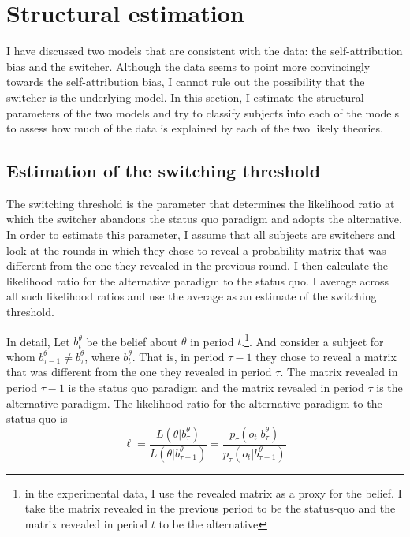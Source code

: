 \documentclass[
  12pt,
]{article}
\begin{document}
\hypertarget{structural-estimation}{%
\section{Structural estimation}\label{structural-estimation}}

I have discussed two models that are consistent with the data: the
self-attribution bias and the switcher. Although the data seems to point
more convincingly towards the self-attribution bias, I cannot rule out
the possibility that the switcher is the underlying model. In this
section, I estimate the structural parameters of the two models and try
to classify subjects into each of the models to assess how much of the
data is explained by each of the two likely theories.

\hypertarget{estimation-of-the-switching-threshold}{%
\subsection{Estimation of the switching
threshold}\label{estimation-of-the-switching-threshold}}

The switching threshold is the parameter that determines the likelihood
ratio at which the switcher abandons the status quo paradigm and adopts
the alternative. In order to estimate this parameter, I assume that all
subjects are switchers and look at the rounds in which they chose to
reveal a probability matrix that was different from the one they
revealed in the previous round. I then calculate the likelihood ratio
for the alternative paradigm to the status quo. I average across all
such likelihood ratios and use the average as an estimate of the
switching threshold.

In detail, Let \(b_{t}^\theta\) be the belief about \(\theta\) in period
\(t\).\footnote{in the experimental data, 
I use the revealed matrix as a proxy for the belief. I take the matrix revealed in the previous period 
to be the status-quo and the matrix revealed in period $t$ to be the alternative}.
And consider a subject for whom
\(b_{\tau-1}^\theta \neq b_{\tau}^\theta\), where \(b_{t}^\theta\). That
is, in period \(\tau-1\) they chose to reveal a matrix that was
different from the one they revealed in period \(\tau\). The matrix
revealed in period \(\tau-1\) is the status quo paradigm and the matrix
revealed in period \(\tau\) is the alternative paradigm. The likelihood
ratio for the alternative paradigm to the status quo is \[
\ell = \frac{L(\theta | b_{\tau}^\theta)}{L(\theta | b_{\tau-1}^\theta)}=\frac{p_\tau(o_t|b_{\tau}^\theta)}{p_{\tau}(o_t|b_{\tau-1}^\theta)} 
\]
\end{document}
